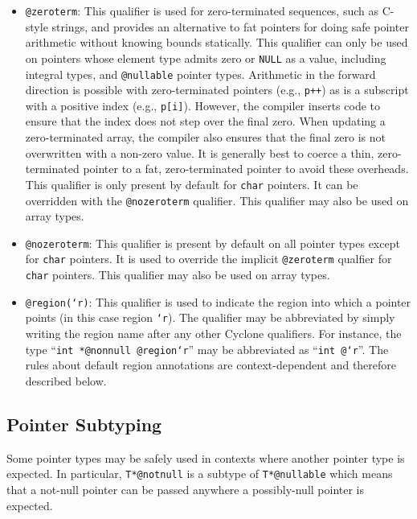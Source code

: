 \begin{itemize}
\item \texttt{@zeroterm}:  This qualifier is used for zero-terminated
sequences, such as C-style strings, and provides an alternative to
fat pointers for doing safe pointer arithmetic without knowing 
bounds statically.  This qualifier can only be used on pointers whose
element type admits zero or \texttt{NULL} as a value, including
integral types, and \texttt{@nullable} pointer types.  Arithmetic
in the forward direction is possible with zero-terminated pointers
(e.g., \texttt{p++}) as is a subscript with a positive index
(e.g., \texttt{p[i]}).  However, the compiler inserts code to ensure
that the index does not step over the final zero.  When updating
a zero-terminated array, the compiler also ensures that the final
zero is not overwritten with a non-zero value.  It is generally best
to coerce a thin, zero-terminated pointer to a fat, zero-terminated
pointer to avoid these overheads.  This qualifier is 
only present by default for \texttt{char} pointers.  It can be
overridden with the \texttt{@nozeroterm} qualifier.  This qualifier
may also be used on array types.

\item \texttt{@nozeroterm}:  
This qualifier is present by default
on all pointer types except for \texttt{char} pointers.  It is
used to override the implicit \texttt{@zeroterm} qualfier for
\texttt{char} pointers.  This qualifier may also be used on array types.

\item \texttt{@region(`r)}:  This qualifier is used to indicate the
region into which a pointer points (in this case region \texttt{`r}).
The qualifier may be abbreviated by simply writing the region name
after any other Cyclone qualifiers.  
For instance, the type ``\texttt{int *@nonnull @region{`r}}''
may be abbreviated as ``\texttt{int @`r}''.  The rules about default
region annotations are context-dependent and therefore described below.
\end{itemize}

\subsection{Pointer Subtyping}

Some pointer types may be safely used in contexts where another
pointer type is expected.  In particular, \texttt{T*@notnull} is a
subtype of \texttt{T*@nullable} which means that a not-null pointer
can be passed anywhere a possibly-null pointer is expected.

